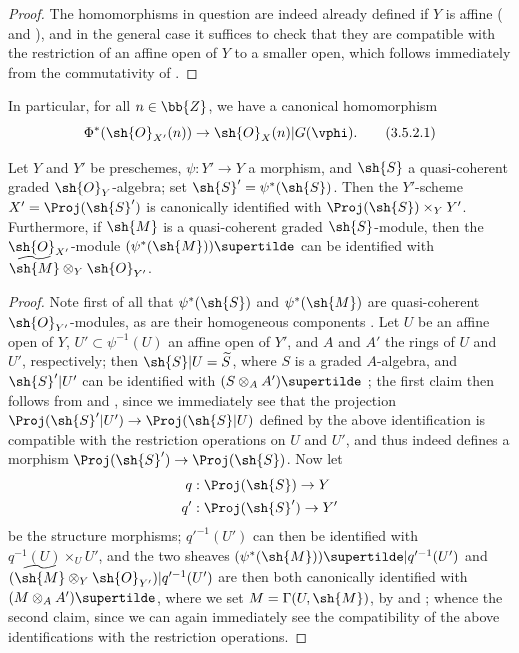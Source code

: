 \begin{proof}
The homomorphisms in question are indeed already defined if $Y$ is affine ( and ), and in the general case it suffices to check that they are compatible with the restriction of an affine open of $Y$ to a smaller open, which follows immediately from the commutativity of .
\end{proof}

In particular, for all $n\in\bb{Z}$, we have a canonical homomorphism
\[
\label{II.3.5.2.1}
  \Phi^*(\sh{O}_{X'}(n)) \to \sh{O}_X(n)|G(\vphi).
\tag{3.5.2.1}
\]

\begin{proposition}[3.5.3]
\label{II.3.5.3}
Let $Y$ and $Y'$ be preschemes, $\psi:Y'\to Y$ a morphism, and $\sh{S}$ a quasi-coherent graded $\sh{O}_Y$-algebra;
set $\sh{S}'=\psi^*(\sh{S})$.
Then the $Y'$-scheme $X'=\Proj(\sh{S}')$ is canonically identified with $\Proj(\sh{S})\times_Y Y'$.
Furthermore, if $\sh{M}$ is a quasi-coherent graded $\sh{S}$-module, then the $\sh{O}_{X'}$-module $(\psi^*(\sh{M}))\supertilde$ can be identified with $\widetilde{\sh{M}}\otimes_Y\sh{O}_{Y'}$.
\end{proposition}

\begin{proof}
Note first of all that $\psi^*(\sh{S})$ and $\psi^*(\sh{M})$ are quasi-coherent $\sh{O}_{Y'}$-modules, as are their homogeneous components .
Let $U$ be an affine open of $Y$, $U'\subset\psi^{-1}(U)$ an affine open of $Y'$, and $A$ and $A'$ the rings of $U$ and $U'$, respectively;
then $\sh{S}|U=\widetilde{S}$, where $S$ is a graded $A$-algebra, and $\sh{S}'|U'$ can be identified with $(S\otimes_A A')\supertilde$ ;
the first claim then follows from  and , since we immediately see that the projection $\Proj(\sh{S}'|U')\to\Proj(\sh{S}|U)$ defined by the above identification is compatible with the restriction operations on $U$ and $U'$, and thus indeed defines a morphism $\Proj(\sh{S}')\to\Proj(\sh{S})$.
Now let
\begin{align*}
  q &: \Proj(\sh{S}) \to Y
\\q'&: \Proj(\sh{S}') \to Y'
\end{align*}
be the structure morphisms;
$q'^{-1}(U')$ can then be identified with $q^{-1}(U)\times_U U'$, and the two sheaves $(\psi^*(\sh{M}))\supertilde|q'^{-1}(U')$ and $(\widetilde{\sh{M}}\otimes_Y\sh{O}_{Y'})|q'^{-1}(U')$ are then both canonically identified with $(M\otimes_A A')\supertilde$, where we set $M=\Gamma(U,\sh{M})$, by  and ;
whence the second claim, since we can again immediately see the compatibility of the above identifications with the restriction operations.
\end{proof}


